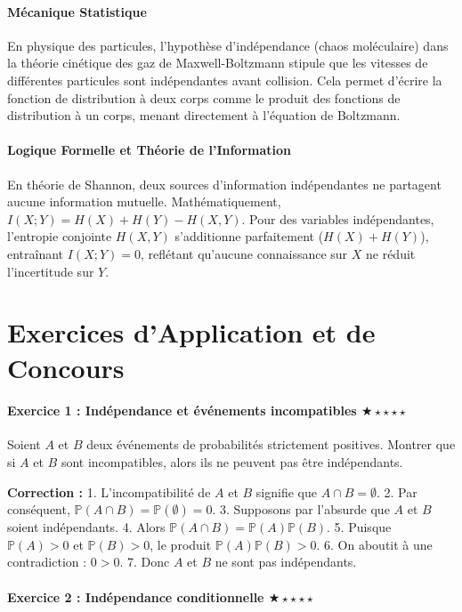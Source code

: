 \documentclass[11pt,a4paper]{article}
\begin{document}
\subsection{Mécanique Statistique}
En physique des particules, l'hypothèse d'indépendance (chaos moléculaire) dans la théorie cinétique des gaz de Maxwell-Boltzmann stipule que les vitesses de différentes particules sont indépendantes avant collision. Cela permet d'écrire la fonction de distribution à deux corps comme le produit des fonctions de distribution à un corps, menant directement à l'équation de Boltzmann.

\subsection{Logique Formelle et Théorie de l'Information}
En théorie de Shannon, deux sources d'information indépendantes ne partagent aucune information mutuelle. Mathématiquement, $I(X;Y) = H(X) + H(Y) - H(X,Y)$. Pour des variables indépendantes, l'entropie conjointe $H(X,Y)$ s'additionne parfaitement ($H(X)+H(Y)$), entraînant $I(X;Y) = 0$, reflétant qu'aucune connaissance sur $X$ ne réduit l'incertitude sur $Y$.


\part{Exercices d'Application et de Concours}

\subsection*{Exercice 1 : Indépendance et événements incompatibles \quad $\bigstar\star\star\star\star$}

Soient $A$ et $B$ deux événements de probabilités strictement positives. Montrer que si $A$ et $B$ sont incompatibles, alors ils ne peuvent pas être indépendants.

\textbf{Correction :}
1. L'incompatibilité de $A$ et $B$ signifie que $A \cap B = \emptyset$.
2. Par conséquent, $\mathbb{P}(A \cap B) = \mathbb{P}(\emptyset) = 0$.
3. Supposons par l'absurde que $A$ et $B$ soient indépendants.
4. Alors $\mathbb{P}(A \cap B) = \mathbb{P}(A)\mathbb{P}(B)$.
5. Puisque $\mathbb{P}(A) > 0$ et $\mathbb{P}(B) > 0$, le produit $\mathbb{P}(A)\mathbb{P}(B) > 0$.
6. On aboutit à une contradiction : $0 > 0$.
7. Donc $A$ et $B$ ne sont pas indépendants.

\subsection*{Exercice 2 : Indépendance conditionnelle \quad $\bigstar\star\star\star\star$}
\end{document}
